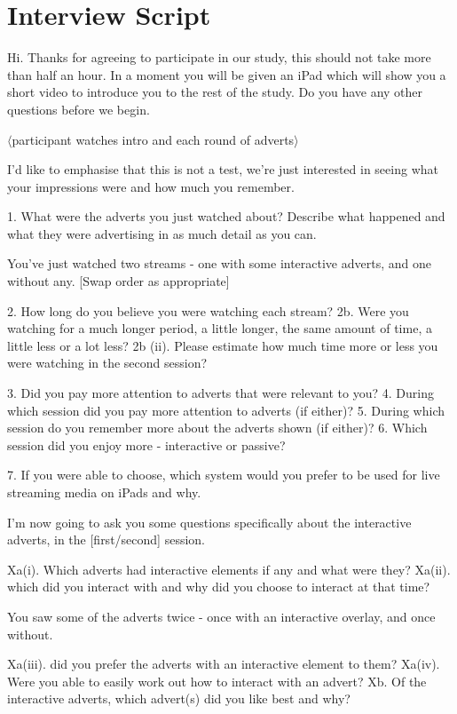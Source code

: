 \section{Interview Script}
	\label{sec:appendix_interview_script}
	Hi.
	Thanks for agreeing to participate in our study, this should not take more than half an hour. In a moment you will be given an iPad which will show you a short video to introduce you to the rest of the study. Do you have any other questions before we begin.

	$\langle$participant watches intro and each round of adverts$\rangle$

	I’d like to emphasise that this is not a test, we’re just interested in seeing what your impressions were and how much you remember.

	1. What were the adverts you just watched about? Describe what happened and what they were advertising in as much detail as you can.

	You’ve just watched two streams - one with some interactive adverts, and one without any. [Swap order as appropriate]

	2. How long do you believe you were watching each stream?
	2b. Were you watching for a much longer period, a little longer, the same amount of time, a little less or a lot less?
	2b (ii). Please estimate how much time more or less you were watching in the second session?

	3. Did you pay more attention to adverts that were relevant to you?
	4. During which session did you pay more attention to adverts (if either)?
	5. During which session do you remember more about the adverts shown (if either)?
	6. Which session did you enjoy more - interactive or passive?

	7. If you were able to choose, which system would you prefer to be used for live streaming media on iPads and why.


	I’m now going to ask you some questions specifically about the interactive adverts, in the [first/second] session.

	Xa(i). Which adverts had interactive elements if any and what were they?
	Xa(ii). which did you interact with and why did you choose to interact at that time?

	You saw some of the adverts twice - once with an interactive overlay, and once without.

	Xa(iii). did you prefer the adverts with an interactive element to them?
	Xa(iv). Were you able to easily work out how to interact with an advert?
	Xb. Of the interactive adverts, which advert(s) did you like best and why?

